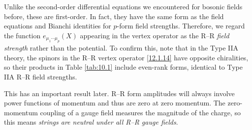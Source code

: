 Unlike the second-order differential equations we encountered for bosonic fields before, these are first-order. In fact, they have the same form as the field equations and Bianchi identities for $p$-form field strengths. Therefore, we regard the function $e_{\mu_{1}\cdots \mu_{p}}(X)$ appearing in the vertex operator as the R--R \textit{field strength} rather than the potential. To confirm this, note that in the Type IIA theory, the spinors in the R--R vertex operator \eqref{12.1.14} have opposite chiralities, so their products in Table \ref{tab:10.1} include even-rank forms, identical to Type IIA R--R field strengths.

This has an important result later. R--R form amplitudes will always involve power functions of momentum and thus are zero at zero momentum. The zero-momentum coupling of a gauge field measures the magnitude of the charge, so this means \textit{strings are neutral under all R--R gauge fields}.

